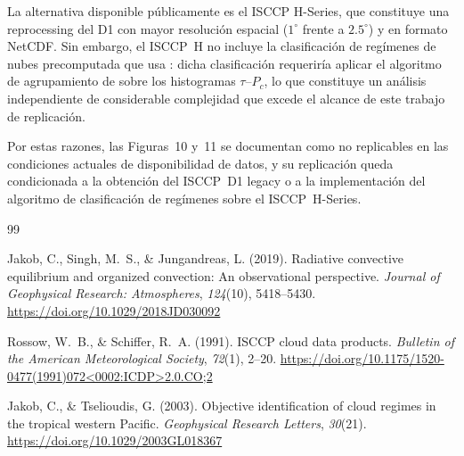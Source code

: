 \documentclass[12pt, a4paper]{article}
\begin{document}
La alternativa disponible públicamente es el ISCCP H-Series, que constituye una reprocessing del D1 con
mayor resolución espacial ($1^\circ$ frente a $2.5^\circ$) y en formato NetCDF.
Sin embargo, el ISCCP~H no incluye la clasificación de regímenes de nubes
precomputada que usa \cite{jakob2019rce}: dicha clasificación requeriría aplicar
el algoritmo de agrupamiento de \cite{jakob2003} sobre los histogramas $\tau$--$P_c$,
lo que constituye un análisis independiente de considerable complejidad que excede
el alcance de este trabajo de replicación.

Por estas razones, las Figuras~10 y~11 se documentan como no replicables en las
condiciones actuales de disponibilidad de datos, y su replicación queda condicionada
a la obtención del ISCCP~D1 legacy o a la implementación del algoritmo de
clasificación de regímenes sobre el ISCCP~H-Series.

\newpage
\begin{thebibliography}{99}
	
	Jakob, C., Singh, M.~S., \& Jungandreas, L. (2019).
	Radiative convective equilibrium and organized convection: An observational perspective.
	\textit{Journal of Geophysical Research: Atmospheres}, \textit{124}(10), 5418--5430.
	\url{https://doi.org/10.1029/2018JD030092}
	
	Rossow, W.~B., \& Schiffer, R.~A. (1991).
	ISCCP cloud data products.
	\textit{Bulletin of the American Meteorological Society}, \textit{72}(1), 2--20.
	\url{https://doi.org/10.1175/1520-0477(1991)072<0002:ICDP>2.0.CO;2}
	
	Jakob, C., \& Tselioudis, G. (2003).
	Objective identification of cloud regimes in the tropical western Pacific.
	\textit{Geophysical Research Letters}, \textit{30}(21).
	\url{https://doi.org/10.1029/2003GL018367}
	
\end{thebibliography}
\end{document}
